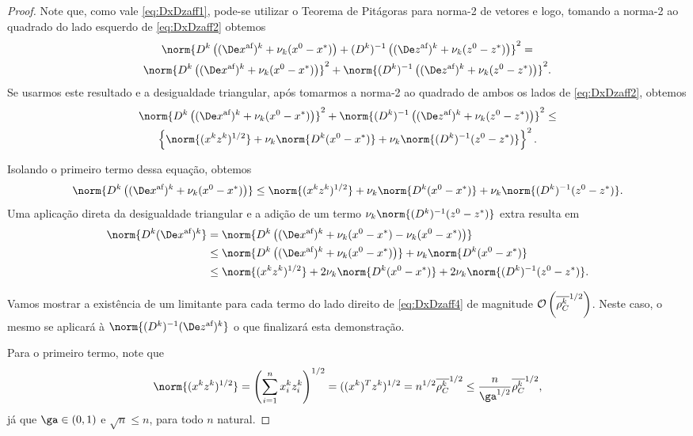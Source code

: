 \begin{proof}
	 Note que, como vale  \eqref{eq:DxDzaff1}, pode-se utilizar o Teorema de Pitágoras para norma-2 de vetores e logo, tomando a norma-2 ao quadrado do lado esquerdo de \eqref{eq:DxDzaff2} obtemos
	\begin{multline*}
			 	 \norm{\Dk\left( \dekx +  \nu_k(\xzero - \xstar)\right)+ \Dik \left( \dekz  +  \nu_k(\zzero - \zstar)\right)}^{2} =\\
	 	 	 	 	 \norm{\Dk\left( \dekx +  \nu_k(\xzero - \xstar)\right)}^{2}+ \norm{\Dik \left( \dekz  +  \nu_k(\zzero - \zstar)\right)}^{2}.
	\end{multline*}
	 Se  usarmos este resultado e a desigualdade triangular, após tomarmos a norma-2 ao quadrado de ambos os lados de \eqref{eq:DxDzaff2}, obtemos 
	 \begin{multline}\label{eq:DxDzaff3}
	 \norm{\Dk\left( \dekx +  \nu_k(\xzero - \xstar)\right)}^{2}+ \norm{\Dik \left( \dekz  +  \nu_k(\zzero - \zstar)\right)}^{2} \leq \\ 
	 \left\{ \norm{(  \xk \zk   )^{1/2}} + \nu_k \norm{\Dk(\xzero - \xstar)} + \nu_k \norm{\Dik(\zzero - \zstar)} \right\}^{2}.
	 \end{multline}

Isolando o primeiro termo dessa equação, obtemos
\[
\norm{\Dk\left( \dekx +  \nu_k(\xzero - \xstar)\right)} \leq  
	  \norm{(  \xk \zk  )^{1/2}} + \nu_k \norm{\Dk(\xzero - \xstar)} + \nu_k \norm{\Dik(\zzero - \zstar)}.
\]
Uma aplicação direta da desigualdade triangular e a adição de um termo  $\nu_k \norm{\Dik(\zzero - \zstar)}$ extra resulta em
\begin{align}
	\norm{\Dk \dekx} & =  \norm{\Dk\left( \dekx  +  \nu_k(\xzero - \xstar)  -  \nu_k(\xzero - \xstar)\right)} \notag \\ 
				 & \leq	 \norm{\Dk\left( \dekx  +  \nu_k(\xzero - \xstar)\right)} +  \nu_k\norm{\Dk(\xzero - \xstar)} \notag \\
				 & \leq \norm{(  \xk \zk  )^{1/2}} + 2 \nu_k \norm{\Dk(\xzero - \xstar)} + 2\nu_k \norm{\Dik(\zzero - \zstar)}.\label{eq:DxDzaff4}
\end{align}

Vamos mostrar a existência de um limitante para cada termo do lado direito de \eqref{eq:DxDzaff4} de magnitude $\mathcal{O}\left(\overline{\rho_C^k}^{1/2}\right)$. Neste caso, o mesmo se aplicará à $\norm{\Dik \dekz }$ o que finalizará esta demonstração.

Para o primeiro termo, note que 
\begin{equation}
	\label{eq:DxDzaff5}
	\norm{(  \xk \zk  )^{1/2}} = \left(\sum_{i=1}^{n}\xk_i \zk_i\right)^{1/2} = ((\xk)^{T}\zk)^{1/2} = n^{1/2}\dbvec{\rho_C^k }^{1/2} \leq \frac{n}{\ga^{1/2}}\dbvec{\rho_C^k }^{1/2},
\end{equation}
já que $\ga\in(0,1)$ e $\sqrt{n}\leq n$, para todo $n$ natural.


\end{proof}
